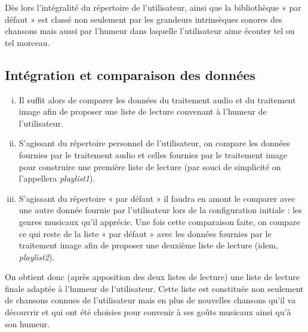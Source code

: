 		Dès lors l’intégralité du répertoire de l’utilisateur, ainsi que la bibliothèque « par défaut » est classé non seulement par les grandeurs intrinsèques sonores des chansons mais aussi par l’humeur dans laquelle l’utilisateur aime écouter tel ou tel morceau.

\subsection{Intégration et comparaison des données}
\label{dB3}

	\begin{enumerate}[(i)]
	\item Il suffit alors de comparer les données du traitement audio et du traitement image afin de proposer une liste de lecture convenant à l’humeur de l’utilisateur.
	\item S’agissant du répertoire personnel de l’utilisateur, on compare les données fournies par le traitement audio et celles fournies par le traitement image pour construire une première liste de lecture (par souci de simplicité on l’appellera \emph{playlist1}).
	\item S’agissant du répertoire « par défaut » il faudra en amont le comparer avec une autre donnée fournie par l’utilisateur lors de la configuration initiale : les genres musicaux qu’il apprécie.
		Une fois cette comparaison faite, on compare ce qui reste de la liste « par défaut » avec les données fournies par le traitement image afin de proposer une deuxième liste de lecture (idem, \emph{playlist2}).
	\end{enumerate}

	On obtient donc (après apposition des deux listes de lecture) une liste de lecture finale adaptée à l’humeur de l’utilisateur.
	Cette liste est constituée non seulement de chansons connues de l’utilisateur mais en plus de nouvelles chansons qu’il va découvrir et qui ont été choisies pour convenir à ses goûts musicaux ainsi qu’à son humeur.
